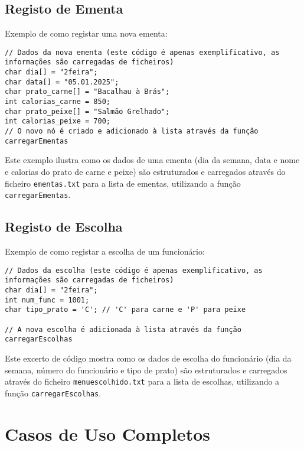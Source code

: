 \documentclass[a4paper,12pt]{report}
\begin{document}
\subsection{Registo de Ementa}
Exemplo de como registar uma nova ementa:

\begin{lstlisting}[caption={Exemplo de registo de ementa},label=lst:exemplo_ementa_reg]
// Dados da nova ementa (este código é apenas exemplificativo, as informações são carregadas de ficheiros)
char dia[] = "2feira";
char data[] = "05.01.2025";
char prato_carne[] = "Bacalhau à Brás";
int calorias_carne = 850;
char prato_peixe[] = "Salmão Grelhado";
int calorias_peixe = 700;
// O novo nó é criado e adicionado à lista através da função carregarEmentas
\end{lstlisting}
Este exemplo ilustra como os dados de uma ementa (dia da semana, data e nome e calorias do prato de carne e peixe) são estruturados e carregados através do ficheiro \texttt{ementas.txt} para a lista de ementas, utilizando a função \texttt{carregarEmentas}.

\subsection{Registo de Escolha}
Exemplo de como registar a escolha de um funcionário:

\begin{lstlisting}[caption={Exemplo de registo de escolha},label=lst:exemplo_escolha_reg]
// Dados da escolha (este código é apenas exemplificativo, as informações são carregadas de ficheiros)
char dia[] = "2feira";
int num_func = 1001;
char tipo_prato = 'C'; // 'C' para carne e 'P' para peixe

// A nova escolha é adicionada à lista através da função carregarEscolhas
\end{lstlisting}
Este excerto de código mostra como os dados de escolha do funcionário (dia da semana, número do funcionário e tipo de prato) são estruturados e carregados através do ficheiro \texttt{menu\textunderscore escolhido.txt} para a lista de escolhas, utilizando a função \texttt{carregarEscolhas}.

\section{Casos de Uso Completos}
\end{document}
